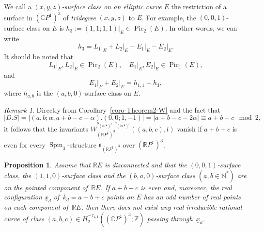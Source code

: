 \documentclass[11pt]{amsart}
\numberwithin{equation}{section}
\theoremstyle{definition}
\theoremstyle{plain}
\newtheorem{proposition}[definition]{Proposition}
\theoremstyle{remark}
\newtheorem{remark}[definition]{Remark}
\newcommand{\R}{\mathbb{R}}
\newcommand{\Z}{\mathbb{Z}}
\newcommand{\C}{\mathbb{C}}
\DeclareMathOperator{\Pic}{Pic}
\DeclareMathOperator{\Spin}{Spin}
\begin{document}
We call a \textit{$(x,y,z)$-surface class on an elliptic curve $E$} the restriction of  a surface in $(\C P^1)^3$ of \textit{tridegree} $(x,y,z)$ to $E$.
For example, the $(0,0,1)$-surface class on $E$ is $h_3:=(1,1;1,1)|_E\in \Pic_2(E)$. In other words, we can write
$$h_3=L_1{|_E}+L_2{|_E}-E_1{|_E}-E_2{|_E}.$$
It should be noted that
$$L_1{|_E},L_2{|_E} \in \Pic_2(E), \quad E_1{|_E},E_2{|_E}\in \Pic_1(E),$$ 
and 
$$E_1{|_E}+E_2{|_E}=h_{1,1}-h_3,$$
where $h_{a,b}$ is the $(a,b,0)$-surface class on $E$. 

\begin{remark}\label{remark12}
Directly from Corollary~\ref{coro-Theorem2-W} and the fact that $$|D.S|=|(a,b;\alpha,a+b-c-\alpha).(0,0;1,-1)|=|a+b-c-2\alpha|\equiv a+b+c \mod 2,$$
it follows that the invariants $W_{(\R P^1)^3}^{\mathfrak{s}_{(\R P^1)^3},\mathfrak{o}_{(\R P^1)^3}}((a,b,c),l)$ vanish if $a+b+c$ is even for every $\Spin_3$-structure $\mathfrak{s}_{(\R P^1)^3}$ over $(\R P^1)^3$.
\end{remark}

\begin{proposition} \label{prop-application.deg6.1}
Assume that $\R E$ is disconnected and that the  $(0,0,1)$-surface class,  the  $(1,1,0)$-surface class and the  $(b,a,0)$-surface class $(a,b\in \mathbb{N}^*)$ are on the pointed component of\, $\R E$.
If $a+b+c$ is even and, moreover, the real configuration $\underline{x}_d$ of\, $k_d=a+b+c$ points on $E$ 
    has an odd number of real points on each component of\, $\R E$, then there does not exist any real irreducible rational curve of class $(a,b,c)\in H_2^{-\tau_{1,1}}((\C P^1)^3;\Z)$ passing through~$\underline{x}_d$. 
\end{proposition}
\end{document}
